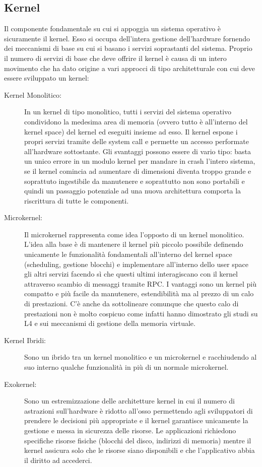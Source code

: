 \subsection{Kernel}
Il componente fondamentale su cui si appoggia un sistema operativo è sicuramente il kernel. Esso si occupa dell'intera gestione dell'hardware fornendo dei meccanismi di base su cui si basano i servizi soprastanti del sistema. Proprio il numero di servizi di base che deve offrire il kernel è causa di un intero movimento che ha dato origine a vari approcci di tipo architetturale con cui deve essere sviluppato un kernel:
\begin{description}
  \item[Kernel Monolitico:] In un kernel di tipo monolitico, tutti i servizi del sistema operativo condividono la medesima area di memoria (ovvero tutto è all'interno del kernel space) del kernel ed eseguiti insieme ad esso. Il kernel espone i propri servizi tramite delle system call e permette un accesso performate all'hardware sottostante. Gli svantaggi possono essere di vario tipo: basta un unico errore in un modulo kernel per mandare in crash l'intero sistema, se il kernel comincia ad aumentare di dimensioni diventa troppo grande e soprattuto ingestibile da manutenere e soprattutto non sono portabili e quindi un passaggio potenziale ad una nuova architettura comporta la riscrittura di tutte le componenti.
  \item[Microkernel:] Il microkernel rappresenta come idea l'opposto di un kernel monolitico. L'idea alla base è di mantenere il kernel più piccolo possibile definendo unicamente le funzionalità fondamentali all'interno del kernel space (scheduling, gestione blocchi) e implementare all'interno dello user space gli altri servizi facendo sì che questi ultimi  interagiscano con il kernel attraverso scambio di messaggi tramite RPC. I vantaggi sono un kernel più compatto e più facile da manutenere, estendibilità ma al prezzo di un calo di prestazioni. C'è anche da sottolineare comunque che questo calo di prestazioni non è molto cospicuo come infatti hanno dimostrato gli studi su L4 e sui meccanismi di gestione della memoria virtuale.
  \item[Kernel Ibridi:] Sono un ibrido tra un kernel monolitico e un microkernel e racchiudendo al suo interno qualche funzionalità in più di un normale microkernel.
  \item[Exokernel:] Sono un estremizzazione delle architetture kernel in cui il numero di astrazioni sull'hardware è ridotto all'osso permettendo agli sviluppatori di prendere le decisioni più appropriate e il kernel garantisce unicamente la gestione e messa in sicurezza delle risorse. Le applicazioni richiedono specifiche risorse fisiche (blocchi del disco, indirizzi di memoria) mentre il kernel assicura solo che le risorse siano disponibili e che l'applicativo abbia il diritto ad accederci.
\end{description}
